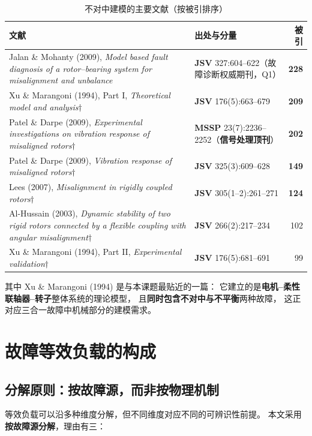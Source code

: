 \documentclass[11pt,a4paper]{ctexart}
\begin{document}
\begin{table}[h]
\centering
\caption{不对中建模的主要文献（按被引排序）}
\small
\begin{tabular}{@{}p{6.1cm}p{3.4cm}r@{}}
\toprule
文献 & 出处与分量 & 被引 \\
\midrule
Jalan \& Mohanty (2009), \emph{Model based fault diagnosis of a rotor--bearing system for misalignment and unbalance}
& \textbf{JSV} 327:604--622（故障诊断权威期刊，Q1） & \textbf{228} \\
Xu \& Marangoni (1994), Part I, \emph{Theoretical model and analysis}\(\dagger\)
& \textbf{JSV} 176(5):663--679 & \textbf{209} \\
Patel \& Darpe (2009), \emph{Experimental investigations on vibration response of misaligned rotors}\(\dagger\)
& \textbf{MSSP} 23(7):2236--2252（\textbf{信号处理顶刊}） & \textbf{202} \\
Patel \& Darpe (2009), \emph{Vibration response of misaligned rotors}\(\dagger\)
& \textbf{JSV} 325(3):609--628 & \textbf{149} \\
Lees (2007), \emph{Misalignment in rigidly coupled rotors}\(\dagger\)
& \textbf{JSV} 305(1--2):261--271 & \textbf{124} \\
Al-Hussain (2003), \emph{Dynamic stability of two rigid rotors connected by a flexible coupling with angular misalignment}\(\dagger\)
& \textbf{JSV} 266(2):217--234 & 102 \\
Xu \& Marangoni (1994), Part II, \emph{Experimental validation}\(\dagger\)
& \textbf{JSV} 176(5):681--691 & 99 \\
\bottomrule
\end{tabular}
\end{table}

\noindent
其中 Xu \& Marangoni (1994) 是与本课题最贴近的一篇：
它建立的是\textbf{电机--柔性联轴器--转子}整体系统的理论模型，
且\textbf{同时包含不对中与不平衡}两种故障，
这正对应三合一故障中机械部分的建模需求。

\section{故障等效负载的构成}
\label{sec:decomp}

\subsection{分解原则：按故障源，而非按物理机制}

等效负载可以沿多种维度分解，但不同维度对应不同的可辨识性前提。
本文采用\textbf{按故障源分解}，理由有三：
\end{document}

